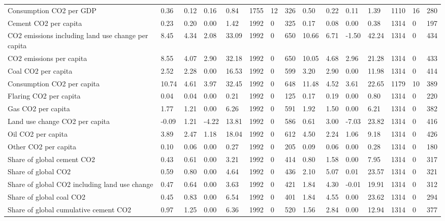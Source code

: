 \begin{longtable}{lllllllllllllll}
\addlinespace
Consumption CO2 per GDP & 0.36 & 0.12 & 0.16 & 0.84 & 1755 & 12 & 326 & 0.50 & 0.22 & 0.11 & 1.39 & 1110 & 16 & 280\\
Cement CO2 per capita & 0.23 & 0.20 & 0.00 & 1.42 & 1992 & 0 & 325 & 0.17 & 0.08 & 0.00 & 0.38 & 1314 & 0 & 197\\
CO2 emissions including land use change per capita & 8.45 & 4.34 & 2.08 & 33.09 & 1992 & 0 & 650 & 10.66 & 6.71 & -1.50 & 42.24 & 1314 & 0 & 434\\
CO2 emissions per capita & 8.55 & 4.07 & 2.90 & 32.18 & 1992 & 0 & 650 & 10.05 & 4.68 & 2.96 & 21.28 & 1314 & 0 & 433\\
Coal CO2 per capita & 2.52 & 2.28 & 0.00 & 16.53 & 1992 & 0 & 599 & 3.20 & 2.90 & 0.00 & 11.98 & 1314 & 0 & 414\\
\addlinespace
Consumption CO2 per capita & 10.74 & 4.61 & 3.97 & 32.45 & 1992 & 0 & 648 & 11.48 & 4.52 & 3.61 & 22.65 & 1179 & 10 & 389\\
Flaring CO2 per capita & 0.04 & 0.04 & 0.00 & 0.21 & 1992 & 0 & 125 & 0.17 & 0.19 & 0.00 & 0.80 & 1314 & 0 & 220\\
Gas CO2 per capita & 1.77 & 1.21 & 0.00 & 6.26 & 1992 & 0 & 591 & 1.92 & 1.50 & 0.00 & 6.21 & 1314 & 0 & 382\\
Land use change CO2 per capita & -0.09 & 1.21 & -4.22 & 13.81 & 1992 & 0 & 586 & 0.61 & 3.00 & -7.03 & 23.82 & 1314 & 0 & 416\\
Oil CO2 per capita & 3.89 & 2.47 & 1.18 & 18.04 & 1992 & 0 & 612 & 4.50 & 2.24 & 1.06 & 9.18 & 1314 & 0 & 426\\
\addlinespace
Other CO2 per capita & 0.10 & 0.06 & 0.00 & 0.27 & 1992 & 0 & 205 & 0.09 & 0.06 & 0.00 & 0.28 & 1314 & 0 & 180\\
Share of global cement CO2 & 0.43 & 0.61 & 0.00 & 3.21 & 1992 & 0 & 414 & 0.80 & 1.58 & 0.00 & 7.95 & 1314 & 0 & 317\\
Share of global CO2 & 0.59 & 0.80 & 0.00 & 4.64 & 1992 & 0 & 436 & 2.10 & 5.07 & 0.01 & 23.57 & 1314 & 0 & 321\\
Share of global CO2 including land use change & 0.47 & 0.64 & 0.00 & 3.63 & 1992 & 0 & 421 & 1.84 & 4.30 & -0.01 & 19.91 & 1314 & 0 & 312\\
Share of global coal CO2 & 0.45 & 0.83 & 0.00 & 6.54 & 1992 & 0 & 401 & 1.84 & 4.55 & 0.00 & 23.62 & 1314 & 0 & 294\\
\addlinespace
Share of global cumulative cement CO2 & 0.97 & 1.25 & 0.00 & 6.36 & 1992 & 0 & 520 & 1.56 & 2.84 & 0.00 & 12.94 & 1314 & 0 & 377\\

\end{longtable}
